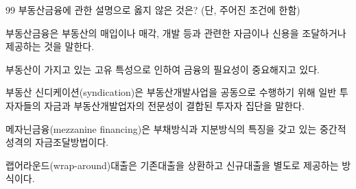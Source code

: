 \begin{question}{99}
부동산금융에 관한 설명으로 옳지 않은 것은? (단, 주어진 조건에 한함)
\begin{choices}
  \item 부동산금융은 부동산의 매입이나 매각, 개발 등과 관련한 자금이나 신용을 조달하거나 제공하는 것을 말한다.
  \item 부동산이 가지고 있는 고유 특성으로 인하여 금융의 필요성이 중요해지고 있다.
  \item 부동산 신디케이션(syndication)은 부동산개발사업을 공동으로 수행하기 위해 일반 투자자들의 자금과 부동산개발업자의 전문성이 결합된 투자자 집단을 말한다.
  \item 메자닌금융(mezzanine financing)은 부채방식과 지분방식의 특징을 갖고 있는 중간적 성격의 자금조달방법이다.
  \item 랩어라운드(wrap-around)대출은 기존대출을 상환하고 신규대출을 별도로 제공하는 방식이다.
\end{choices}
\end{question}
